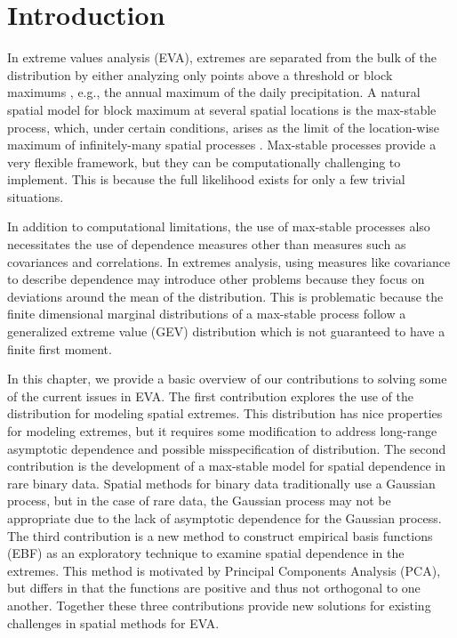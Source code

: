 \chapter{Introduction}
\label{chap:one}

In extreme values analysis (EVA), extremes are separated from the bulk of the distribution by either analyzing only points above a threshold or block maximums \citep{Coles2001}, e.g., the annual maximum of the daily precipitation.
A natural spatial model for block maximum at several spatial locations is the max-stable process, which, under certain conditions, arises as the limit of the location-wise maximum of infinitely-many spatial processes \citep{deHaan2006}.
Max-stable processes provide a very flexible framework, but they can be computationally challenging to implement.
This is because the full likelihood exists for only a few trivial situations.

In addition to computational limitations, the use of max-stable processes also necessitates the use of dependence measures other than measures such as covariances and correlations.
In extremes analysis, using measures like covariance to describe dependence may introduce other problems because they focus on deviations around the mean of the distribution.
This is problematic because the finite dimensional marginal distributions of a max-stable process follow a generalized extreme value (GEV) distribution which is not guaranteed to have a finite first moment.

In this chapter, we provide a basic overview of our contributions to solving some of the current issues in EVA.
The first contribution explores the use of the \skewt{} distribution for modeling spatial extremes.
This distribution has nice properties for modeling extremes, but it requires some modification to address long-range asymptotic dependence and possible misspecification of distribution.
The second contribution is the development of a max-stable model for spatial dependence in rare binary data.
Spatial methods for binary data traditionally use a Gaussian process, but in the case of rare data, the Gaussian process may not be appropriate due to the lack of asymptotic dependence for the Gaussian process.
The third contribution is a new method to construct empirical basis functions (EBF) as an exploratory technique to examine spatial dependence in the extremes.
This method is motivated by Principal Components Analysis (PCA), but differs in that the functions are positive and thus not orthogonal to one another.
Together these three contributions provide new solutions for existing challenges in spatial methods for EVA.

